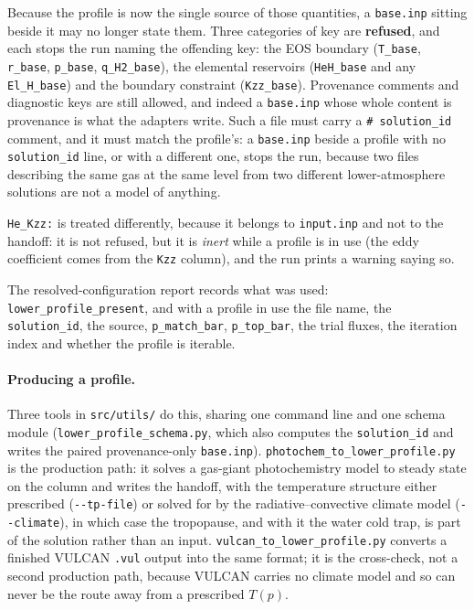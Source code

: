 \documentclass[english,a4paper]{my_memo}
\begin{document}
Because the profile is now the single source of those quantities, a
\texttt{base.inp} sitting beside it may no longer state them. Three categories
of key are \textbf{refused}, and each stops the run naming the offending key:
the EOS boundary (\texttt{T\_base}, \texttt{r\_base}, \texttt{p\_base},
\texttt{q\_H2\_base}), the elemental reservoirs (\texttt{HeH\_base} and any
\texttt{El\_H\_base}) and the boundary constraint (\texttt{Kzz\_base}).
Provenance comments and diagnostic keys are still allowed, and indeed a
\texttt{base.inp} whose whole content is provenance is what the adapters write.
Such a file must carry a \texttt{\# solution\_id} comment, and it must match
the profile's: a \texttt{base.inp} beside a profile with no
\texttt{solution\_id} line, or with a different one, stops the run, because two
files describing the same gas at the same level from two different
lower-atmosphere solutions are not a model of anything.

\texttt{He\_Kzz:} is treated differently, because it belongs to
\texttt{input.inp} and not to the handoff: it is not refused, but it is
\emph{inert} while a profile is in use (the eddy coefficient comes from the
\texttt{Kzz} column), and the run prints a warning saying so.

The resolved-configuration report records what was used:
\texttt{lower\_profile\_present}, and with a profile in use the file name, the
\texttt{solution\_id}, the source, \texttt{p\_match\_bar},
\texttt{p\_top\_bar}, the trial fluxes, the iteration index and whether the
profile is iterable.

\paragraph{Producing a profile.} Three tools in \texttt{src/utils/} do this,
sharing one command line and one schema module
(\texttt{lower\_profile\_schema.py}, which also computes the
\texttt{solution\_id} and writes the paired provenance-only
\texttt{base.inp}). \texttt{photochem\_to\_lower\_profile.py} is the
production path: it solves a gas-giant photochemistry model to steady state on
the column and writes the handoff, with the temperature structure either
prescribed (\texttt{-{}-tp-file}) or solved for by the radiative--convective
climate model (\texttt{-{}-climate}), in which case the tropopause, and with it
the water cold trap, is part of the solution rather than an input.
\texttt{vulcan\_to\_lower\_profile.py} converts a finished VULCAN
\texttt{.vul} output into the same format; it is the cross-check, not a
second production path, because VULCAN carries no climate model and so can
never be the route away from a prescribed $T(p)$.
\end{document}
